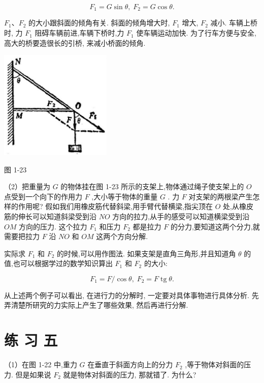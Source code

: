 \documentclass[10pt]{article}
\begin{document}
\[
{F}_{1} = G\sin \theta ,\;{F}_{2} = G\cos \theta .
\]

\({F}_{1}\text{、}{F}_{2}\) 的大小跟斜面的倾角有关. 斜面的倾角增大时, \({F}_{1}\) 增大, \({F}_{2}\) 减小. 车辆上桥时, 力 \({F}_{1}\) 阻碍车辆前进,车辆下桥时,力 \({F}_{1}\) 使车辆运动加快. 为了行车方便与安全, 高大的桥要造很长的引桥, 来减小桥面的倾角.

\begin{center}
\includegraphics[max width=0.4\textwidth]{images/01912d55-147c-70aa-b0e0-1782a122f948_35_987792.jpg}
\end{center}

图 1-23

（2）把重量为 \(G\) 的物体挂在图 1-23 所示的支架上,物体通过绳子使支架上的 \(O\) 点受到一个向下的作用力 \(F\) ,大小等于物体的重量 \(G\) . 力 \(F\) 对支架的两根梁产生怎样的作用呢? 假如我们用橡皮筋代替斜梁,用手臂代替横梁,指尖顶在 \(O\) 处,从橡皮筋的伸长可以知道斜梁受到沿 \({NO}\) 方向的拉力,从手的感受可以知道横梁受到沿 \({OM}\) 方向的压力. 这个拉力 \({F}_{1}\) 和压力 \({F}_{2}\) 都是拉力 \(F\) 的分力,要知道这两个分力,就需要把拉力 \(F\) 沿 \({NO}\) 和 \({OM}\) 这两个方向分解.

实际求 \({F}_{1}\) 和 \({F}_{2}\) 的时候,可以用作图法. 如果支架是直角三角形,并且知道角 \(\theta\) 的值,也可以根据学过的数学知识算出 \({F}_{1}\) 和 \({F}_{2}\) 的大小:

\[
{F}_{1} = F/\cos \theta ,\;{F}_{2} = F\operatorname{tg}\theta .
\]

从上述两个例子可以看出, 在进行力的分解时, 一定要对具体事物进行具体分析. 先弄清楚所研究的力实际上产生了哪些效果, 然后再进行分解.

\section*{练 习 五}

（1）在图 1-22 中,重力 \(G\) 在垂直于斜面方向上的分力 \({F}_{2}\) ,等于物体对斜面的压力. 但是如果说 \({F}_{2}\) 就是物体对斜面的压力, 那就错了. 为什么?
\end{document}
